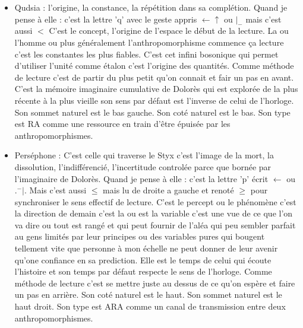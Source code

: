 \documentclass{article}
\begin{document}
\begin{itemize}
\item Qudsia : l’origine, la constance, la répétition dans sa complétion.  Quand je pense à elle : c'est la lettre 'q' avec le geste appris  $\leftarrow\uparrow$ ou $|_-$ mais c'est aussi  $<$ C'est le concept, l'origine de l'espace le début de la lecture.  La ou  l'homme ou plus généralement l'anthropomorphisme  commence ça lecture c'est les constantes les plus fiables. C'est cet infini bosonique qui permet d'utiliser  l'unité comme étalon c'est l'origine des quantités. Comme méthode de lecture c'est de partir du plus petit qu'on connait et fair un pas en avant. C'est la mémoire imaginaire cumulative de Dolorès qui est explorée de la plus récente à  la plus vieille son sens par défaut est l'inverse de celui de l'horloge. Son sommet naturel est le bas gauche. Son coté naturel est le bas. Son type est RA comme une ressource en train d'être épuisée par les anthropomorphismes.

\item Perséphone : C'est celle qui traverse le Styx c'est l'image de la mort, la dissolution, l’indifférencié, l’incertitude controlée parce que bornée par l'imaginaire de Dolorès.  Quand je pense à elle : c'est la lettre 'p'  écrit $ \leftarrow$ ou $ .^-|$. Mais c'est aussi $\le$ mais lu de droite a gauche et renoté $\ge$ pour synchroniser le sens effectif de lecture.
C'est le percept ou le phénomène c'est la direction de demain c'est la ou est la variable c'est une vue de ce   que l'on va dire  ou tout est rangé et qui peut fournir de l'aléa  qui peu sembler parfait au gens limités par leur principes ou des variables pures qui bougent tellement vite que  personne à mon échelle ne peut donner de leur avenir qu'one confiance en sa prediction. Elle est le temps de celui qui écoute l'histoire et son temps par défaut respecte le sens de l'horloge.
Comme méthode de lecture c'est se mettre juste au dessus de ce qu'on espère et faire un pas en arrière. Son coté naturel est le haut. Son sommet naturel est le haut droit.  Son type est ARA comme un canal de transmission entre deux anthropomorphismes.


\end{itemize}
\end{document}
